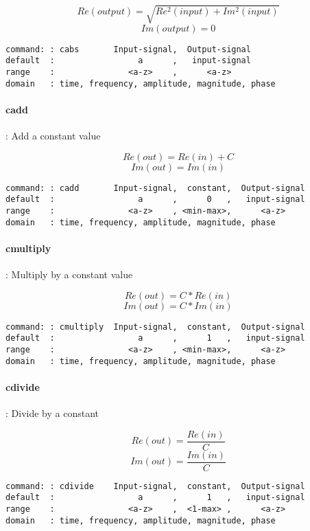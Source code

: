 \documentclass{report}
\newcommand{\bc}{\scriptsize}
\newcommand{\ec}{\normalsize}
\begin{document}
\[ Re(output) = \sqrt{Re^{2}(input) + Im^{2}(input)} \]
\[ Im(output) = 0 \]

\bc
\begin{verbatim}
command: : cabs       Input-signal,  Output-signal
default  :                 a      ,   input-signal  
range    :               <a-z>    ,      <a-z>
domain   : time, frequency, amplitude, magnitude, phase
\end{verbatim}
\ec

\paragraph{cadd}: Add a constant value

\[ Re(out) = Re(in) + C \]
\[ Im(out) = Im(in) \]

\bc
\begin{verbatim}
command: : cadd       Input-signal,  constant,  Output-signal
default  :                 a      ,      0   ,   input-signal  
range    :               <a-z>    , <min-max>,      <a-z>
domain   : time, frequency, amplitude, magnitude, phase
\end{verbatim}
\ec


\paragraph{cmultiply}: Multiply by a constant value

\[ Re(out) = C*Re(in) \]
\[ Im(out) = C*Im(in) \]

\bc
\begin{verbatim}
command: : cmultiply  Input-signal,  constant,  Output-signal
default  :                 a      ,      1   ,   input-signal  
range    :               <a-z>    , <min-max>,      <a-z>
domain   : time, frequency, amplitude, magnitude, phase
\end{verbatim}
\ec

\paragraph{cdivide}: Divide by a constant

\[ Re(out) = \frac{Re(in)}{C} \]
\[ Im(out) = \frac{Im(in)}{C} \]

\bc
\begin{verbatim}
command: : cdivide    Input-signal,  constant,  Output-signal
default  :                 a      ,      1   ,   input-signal  
range    :               <a-z>    ,  <1-max> ,      <a-z>
domain   : time, frequency, amplitude, magnitude, phase
\end{verbatim}
\ec
\end{document}
